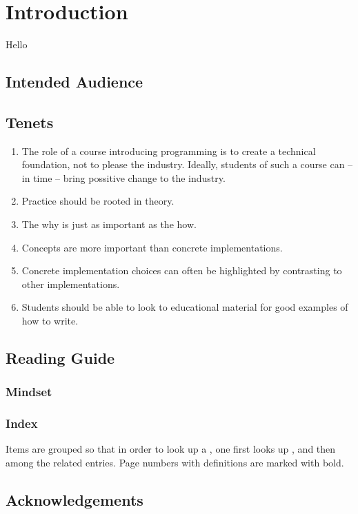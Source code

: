 \chapter{Introduction}
\label{sec:intro}

Hello

\section{Intended Audience}

\section{Tenets}

\begin{enumerate}
  \item The role of a course introducing programming is to create a technical foundation, not to please the industry. Ideally, students of such a course can -- in time -- bring possitive change to the industry.
  \item Practice should be rooted in theory.
  \item The why is just as important as the how.
  \item Concepts are more important than concrete implementations.
  \item Concrete implementation choices can often be highlighted by contrasting to other implementations.
  \item Students should be able to look to educational material for good examples of how to write.
\end{enumerate}

\section{Reading Guide}

\subsection{Mindset}

\begin{enumerate}
\end{enumerate}

\subsection{Index}

Items are grouped so that in order to look up a , one first looks up , and then  among the related entries. Page numbers with definitions are marked with bold.

\section{Acknowledgements}
